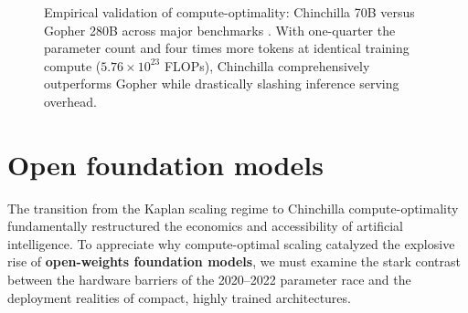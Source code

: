 \documentclass[../../main.tex]{subfiles}
\begin{document}
\begin{figure}[htbp]
\centering
{}
\caption{Empirical validation of compute-optimality: Chinchilla 70B versus Gopher 280B across major benchmarks \cite{hoffmann2022}. With one-quarter the parameter count and four times more tokens at identical training compute ($5.76 \times 10^{23}$ FLOPs), Chinchilla comprehensively outperforms Gopher while drastically slashing inference serving overhead.}
\label{fig:slide22_chinchilla_vs_gopher}
\label{fig:chinchilla_vs_gopher_benchmarks}
\end{figure}

\clearpage
\section{Open foundation models}
\label{sec:open_weights_ecosystem}

The transition from the Kaplan scaling regime to Chinchilla compute-optimality fundamentally restructured the economics and accessibility of artificial intelligence. To appreciate why compute-optimal scaling catalyzed the explosive rise of \textbf{open-weights foundation models}, we must examine the stark contrast between the hardware barriers of the 2020--2022 parameter race and the deployment realities of compact, highly trained architectures.
\end{document}
